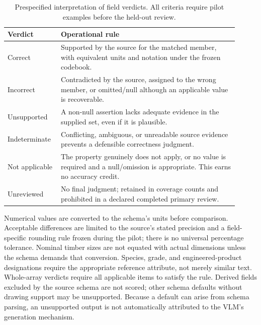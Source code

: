 \documentclass[11pt]{article}
\begin{document}
\begin{table}[ht]
\centering\small
\caption{Prespecified interpretation of field verdicts. All criteria require pilot examples before the held-out review.}
\begin{tabular}{@{}p{0.19\linewidth}p{0.72\linewidth}@{}}
\toprule
Verdict & Operational rule \\
\midrule
Correct & Supported by the source for the matched member, with equivalent units and notation under the frozen codebook. \\
Incorrect & Contradicted by the source, assigned to the wrong member, or omitted/null although an applicable value is recoverable. \\
Unsupported & A non-null assertion lacks adequate evidence in the supplied set, even if it is plausible. \\
Indeterminate & Conflicting, ambiguous, or unreadable source evidence prevents a defensible correctness judgment. \\
Not applicable & The property genuinely does not apply, or no value is required and a null/omission is appropriate. This earns no accuracy credit. \\
Unreviewed & No final judgment; retained in coverage counts and prohibited in a declared completed primary review. \\
\bottomrule
\end{tabular}
\end{table}

Numerical values are converted to the schema's units before comparison. Acceptable differences are limited to the source's stated precision and a field-specific rounding rule frozen during the pilot; there is no universal percentage tolerance. Nominal timber sizes are not equated with actual dimensions unless the schema demands that conversion. Species, grade, and engineered-product designations require the appropriate reference attribute, not merely similar text. Whole-array verdicts require all applicable items to satisfy the rule. Derived fields excluded by the source schema are not scored; other schema defaults without drawing support may be unsupported. Because a default can arise from schema parsing, an unsupported output is not automatically attributed to the VLM's generation mechanism.
\end{document}
